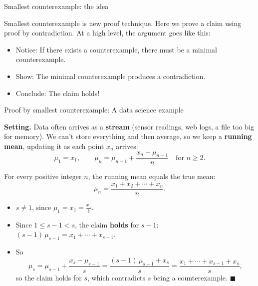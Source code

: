 \documentclass[10pt]{beamer}
\begin{document}
\begin{frame}{Smallest counterexample: the idea}

Smallest counterexample is new proof technique.  \pause Here we prove a claim using \alert{proof by contradiction.}
\pause 
\vfill
At a high level, the argument goes like this:
\begin{itemize}
\item Notice: If there exists a counterexample, there must be a minimal counterexample. \pause 
\item Show: The minimal counterexample produces a contradiction. \pause 
\item Conclude: The claim holds!	
\end{itemize} 
	
\end{frame}


\begin{frame}{Proof by smallest counterexample: A data science example}
\footnotesize

\colorbox{yellow!30}{\textbf{Setting.}} Data often arrives as a \textbf{stream} (sensor readings, web logs, a file too big for memory).  We can't store everything and then average, so we keep a \textbf{running mean}, updating it as each point $x_n$ arrives:
\[ \mu_1 = x_1, \qquad \mu_n = \mu_{n-1} + \frac{x_n - \mu_{n-1}}{n} \quad \text{for } n \geq 2. \]

\pause
\vfill
\begin{mybluebox}[title=\text{Claim.}]
For every positive integer $n$, the running mean equals the true mean:
\[ \mu_n = \frac{x_1 + x_2 + \cdots + x_n}{n}. \]
\end{mybluebox}

\pause
\vfill
{}
\begin{itemize}
\item<4-> $s \neq 1$, since $\mu_1 = x_1 = \frac{x_1}{1}$.  %
\item<5-> Since $1 \leq s-1 < s$, the claim \textbf{holds} for $s-1$:  \quad $(s-1)\,\mu_{s-1} = x_1 + \cdots + x_{s-1}$.
\item<6-> So
\[ \mu_s = \mu_{s-1} + \frac{x_s - \mu_{s-1}}{s} = \frac{(s-1)\,\mu_{s-1} + x_s}{s} = \frac{x_1 + \cdots + x_{s-1} + x_s}{s}, \]
so the claim holds for $s$, which contradicts $s$ being a counterexample. $\blacksquare$ \end{itemize}


\end{frame}
\end{document}
